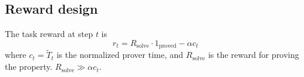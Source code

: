 \subsection{Reward design}
The task reward at step $t$ is
\[
  r_t = R_{\mathrm{solve}} \cdot 1_{\text{proved}} - \alpha c_t
\]
where $c_t = \widetilde{T}_t$ is the normalized prover time, and $R_{\mathrm{solve}}$ is the reward for proving the property. $R_{\mathrm{solve}} \gg \alpha c_t$.
